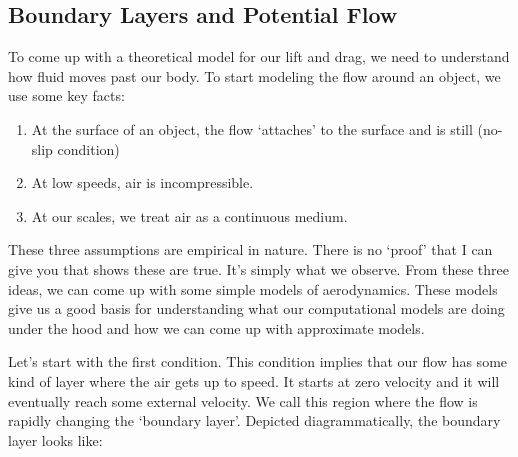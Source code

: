 \documentclass[10pt, openany, titlepage]{book}
\theoremstyle{definition}
\begin{document}
\subsection{Boundary Layers and Potential Flow}

To come up with a theoretical model for our lift and drag, we need to understand how fluid moves past our body. To start modeling the flow around an object, we use some key facts:
\begin{enumerate}
    \item At the surface of an object, the flow `attaches' to the surface and is still (no-slip condition)
    \item At low speeds, air is incompressible.
    \item At our scales, we treat air as a continuous medium.
\end{enumerate}

These three assumptions are empirical in nature. There is no `proof' that I can give you that shows these are true. It's simply what we observe. From these three ideas, we can come up with some simple models of aerodynamics. These models give us a good basis for understanding what our computational models are doing under the hood and how we can come up with approximate models.

Let's start with the first condition. This condition implies that our flow has some kind of layer where the air gets up to speed. It starts at zero velocity and it will eventually reach some external velocity. We call this region where the flow is rapidly changing the `boundary layer'. Depicted diagrammatically, the boundary layer looks like:
\end{document}
